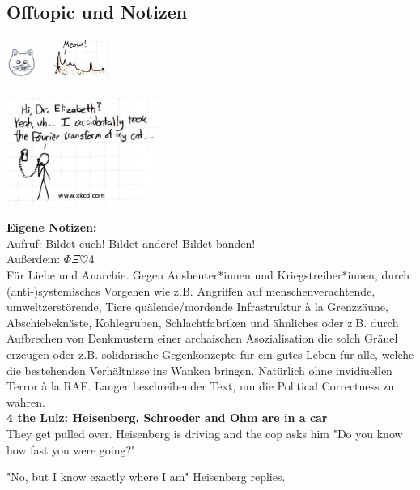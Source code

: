 \documentclass[fs, footer]{latex4ei}
\begin{document}
\begin{multicols*}{4}
\section{Offtopic und Notizen}
 \qquad \includegraphics[height = 1cm]{./img/cat.jpg} \ \raisebox{0.5cm}{$\FT$}\ \includegraphics[height = 1.3cm]{./img/cat_f.jpg}\\
\\
\includegraphics[width = 5cm]{./img/xkcd2.jpg}


\vspace{0.2cm}
{\Huge \bf Eigene Notizen:}\\

Aufruf: Bildet euch! Bildet andere! Bildet banden! \\
Außerdem: $\Phi \Xi \heartsuit$4\CircledA \\ %
Für Liebe und Anarchie. Gegen Ausbeuter*innen und Kriegstreiber*innen, durch (anti-)systemisches Vorgehen wie z.B. Angriffen auf menschenverachtende, umweltzerstörende, Tiere quälende/mordende Infrastruktur à la Grenzzäune, Abschiebeknäste, Kohlegruben, Schlachtfabriken und ähnliches oder z.B. durch Aufbrechen von Denkmustern einer archaischen Asozialisation die solch Gräuel erzeugen oder z.B. solidarische Gegenkonzepte für ein gutes Leben für alle, welche die bestehenden Verhältnisse ins Wanken bringen. Natürlich ohne invidiuellen Terror à la RAF. Langer beschreibender Text, um die Political Correctness zu wahren.\\

\textbf{4 the Lulz: Heisenberg, Schroeder and Ohm are in a car}\\
They get pulled over. Heisenberg is driving and the cop asks him "Do you know how fast you were going?"

"No, but I know exactly where I am" Heisenberg replies.


\end{multicols*}
\end{document}
